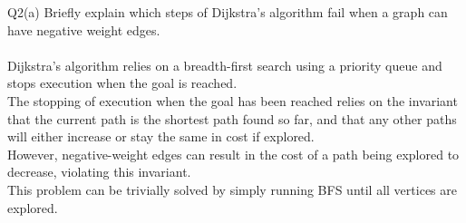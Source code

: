 \begin{problem}
  {Q2(a)}
  Briefly explain which steps of Dijkstra's algorithm fail when a graph can have negative weight edges. \\\\
  Dijkstra's algorithm relies on a breadth-first search using a priority queue and stops execution when the goal is reached. \\
  The stopping of execution when the goal has been reached relies on the invariant that the current path is the shortest path found
  so far, and that any other paths will either increase or stay the same in cost if explored. \\
  However, negative-weight edges can result in the cost of a path being explored to decrease, violating this invariant. \\
  This problem can be trivially solved by simply running BFS until all vertices are explored. \\
\end{problem}
